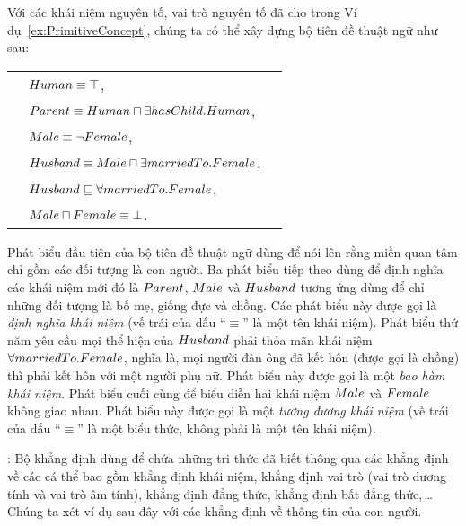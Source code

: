 \begin{Example}\label{ex:TBox}
	Với các khái niệm nguyên tố, vai trò nguyên tố đã cho trong Ví dụ~\ref{ex:PrimitiveConcept}, chúng ta có thể xây dựng bộ tiên đề thuật ngữ như sau: \\[1.0ex]
	\begin{tabular}{c l l}
		& $Human \equiv \top$, &\\[0.5ex]
		& $Parent \equiv Human \sqcap \exists hasChild.Human$,& \\[0.5ex]
		& $Male \equiv \neg Female$, & \\[0.5ex]
		& $Husband \equiv Male \sqcap \exists marriedTo.Female$,& \\[0.5ex]
		& $Husband \sqsubseteq \forall marriedTo.Female$,& \\[0.5ex]
		& $Male \sqcap Female \equiv \bot$.&
	\end{tabular}

Phát biểu đầu tiên của bộ tiên đề thuật ngữ dùng để nói lên rằng miền quan tâm chỉ gồm các đối tượng là con người. Ba phát biểu tiếp theo dùng để định nghĩa các khái niệm mới đó là $Parent$, $Male$ và $Husband$ tương ứng dùng để chỉ những đối tượng là bố mẹ, giống đực và chồng. Các phát biểu này được gọi là {\em định nghĩa khái niệm} (vế trái của dấu ``$\equiv$'' là một tên khái niệm).
%
Phát biểu thứ năm yêu cầu mọi thể hiện của $Husband$ phải thỏa mãn khái niệm $\forall marriedTo.Female$, nghĩa là, mọi người đàn ông đã kết hôn (được gọi là chồng) thì phải kết hôn với một người phụ nữ. Phát biểu này được gọi là một {\em bao hàm khái niệm}.
%
Phát biểu cuối cùng để biểu diễn hai khái niệm $Male$ và $Female$ không giao nhau.
Phát biểu này được gọi là một {\em tương đương khái niệm} (vế trái của dấu ``$\equiv$'' là một biểu thức, không phải là một tên khái niệm).\myend
%
\end{Example}

: Bộ khẳng định dùng để chứa những tri thức đã biết thông qua các khẳng định về các cá thể bao gồm khẳng định khái niệm, khẳng định vai trò (vai trò dương tính và vai trò âm tính), khẳng định đẳng thức, khẳng định bất đẳng thức,\,\ldots\, Chúng ta xét ví dụ sau đây với các khẳng định về thông tin của con người.

